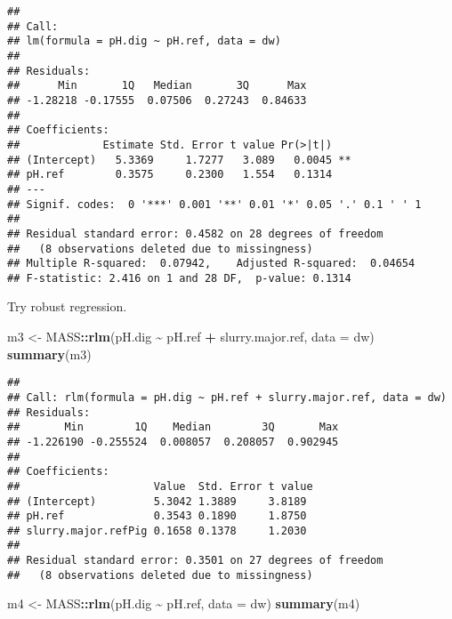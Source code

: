 \documentclass[
]{article}
\newenvironment{Shaded}{\begin{snugshade}}{\end{snugshade}}
\newcommand{\AttributeTok}[1]{\textcolor[rgb]{0.13,0.29,0.53}{#1}}
\newcommand{\FunctionTok}[1]{\textcolor[rgb]{0.13,0.29,0.53}{\textbf{#1}}}
\newcommand{\NormalTok}[1]{#1}
\newcommand{\OtherTok}[1]{\textcolor[rgb]{0.56,0.35,0.01}{#1}}
\newcommand{\SpecialCharTok}[1]{\textcolor[rgb]{0.81,0.36,0.00}{\textbf{#1}}}
\begin{document}
\begin{verbatim}
## 
## Call:
## lm(formula = pH.dig ~ pH.ref, data = dw)
## 
## Residuals:
##      Min       1Q   Median       3Q      Max 
## -1.28218 -0.17555  0.07506  0.27243  0.84633 
## 
## Coefficients:
##             Estimate Std. Error t value Pr(>|t|)   
## (Intercept)   5.3369     1.7277   3.089   0.0045 **
## pH.ref        0.3575     0.2300   1.554   0.1314   
## ---
## Signif. codes:  0 '***' 0.001 '**' 0.01 '*' 0.05 '.' 0.1 ' ' 1
## 
## Residual standard error: 0.4582 on 28 degrees of freedom
##   (8 observations deleted due to missingness)
## Multiple R-squared:  0.07942,    Adjusted R-squared:  0.04654 
## F-statistic: 2.416 on 1 and 28 DF,  p-value: 0.1314
\end{verbatim}

Try robust regression.

\begin{Shaded}
\begin{Highlighting}[]
\NormalTok{m3 }\OtherTok{\textless{}{-}}\NormalTok{ MASS}\SpecialCharTok{::}\FunctionTok{rlm}\NormalTok{(pH.dig }\SpecialCharTok{\textasciitilde{}}\NormalTok{ pH.ref }\SpecialCharTok{+}\NormalTok{ slurry.major.ref, }\AttributeTok{data =}\NormalTok{ dw)}
\FunctionTok{summary}\NormalTok{(m3)}
\end{Highlighting}
\end{Shaded}

\begin{verbatim}
## 
## Call: rlm(formula = pH.dig ~ pH.ref + slurry.major.ref, data = dw)
## Residuals:
##       Min        1Q    Median        3Q       Max 
## -1.226190 -0.255524  0.008057  0.208057  0.902945 
## 
## Coefficients:
##                     Value  Std. Error t value
## (Intercept)         5.3042 1.3889     3.8189 
## pH.ref              0.3543 0.1890     1.8750 
## slurry.major.refPig 0.1658 0.1378     1.2030 
## 
## Residual standard error: 0.3501 on 27 degrees of freedom
##   (8 observations deleted due to missingness)
\end{verbatim}

\begin{Shaded}
\begin{Highlighting}[]
\NormalTok{m4 }\OtherTok{\textless{}{-}}\NormalTok{ MASS}\SpecialCharTok{::}\FunctionTok{rlm}\NormalTok{(pH.dig }\SpecialCharTok{\textasciitilde{}}\NormalTok{ pH.ref, }\AttributeTok{data =}\NormalTok{ dw)}
\FunctionTok{summary}\NormalTok{(m4)}
\end{Highlighting}
\end{Shaded}
\end{document}

